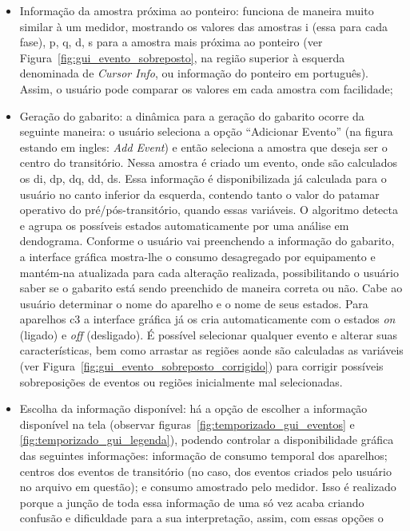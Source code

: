 \begin{itemize}
\item Informação da amostra próxima ao ponteiro: funciona de maneira
muito similar à um medidor, mostrando os valores das amostras \acs{i}
(essa para cada fase), \acs{p}, \acs{q}, \acs{d}, \acs{s} para a
amostra mais próxima ao ponteiro (ver
Figura~\ref{fig:gui_evento_sobreposto}, na região superior à esquerda
denominada de \emph{Cursor Info}, ou informação do ponteiro em
português). Assim, o usuário pode comparar os
valores em cada amostra com facilidade;
\item Geração do gabarito: a dinâmica para a geração do gabarito
ocorre da seguinte maneira: o usuário
seleciona a opção ``Adicionar Evento'' (na figura estando em ingles:
\emph{Add Event}) e então seleciona a amostra que deseja ser o centro
do transitório. Nessa amostra é criado um evento, onde são calculados
os \acs{di}, \acs{dp}, \acs{dq}, \acs{dd}, \acs{ds}. Essa informação é
disponibilizada já calculada para o usuário no canto inferior da
esquerda, contendo tanto o valor do patamar operativo do 
pré/pós-transitório, quando essas variáveis. O algoritmo
detecta e agrupa os possíveis estados automaticamente por uma análise
em dendograma. Conforme o usuário vai preenchendo a informação do
gabarito, a interface gráfica mostra-lhe o consumo desagregado por
equipamento e mantém-na atualizada para cada alteração realizada,
possibilitando o usuário saber se o gabarito está sendo preenchido de
maneira correta ou não. Cabe ao usuário determinar o nome do aparelho
e o nome de seus estados. Para aparelhos \acs{c3} a interface gráfica
já os cria automaticamente com o estados \emph{on} (ligado) e
\emph{off} (desligado). É possível selecionar qualquer evento e
alterar suas características, bem como arrastar as regiões aonde são
calculadas as variáveis (ver
Figura~\ref{fig:gui_evento_sobreposto_corrigido}) para corrigir
possíveis sobreposições de eventos ou regiões inicialmente mal
selecionadas.
\item Escolha da informação disponível: há a opção de escolher a
informação disponível na tela (observar
figuras~\ref{fig:temporizado_gui_eventos} e
\ref{fig:temporizado_gui_legenda}),
podendo controlar a disponibilidade gráfica das seguintes informações:
informação de consumo temporal dos aparelhos; centros dos eventos de
transitório (no caso, dos eventos criados pelo usuário no arquivo em
questão); e consumo amostrado pelo medidor. Isso é realizado porque a
junção de toda essa informação de uma só vez acaba criando confusão e
dificuldade para a sua interpretação, assim, com essas opções o

\end{itemize}
